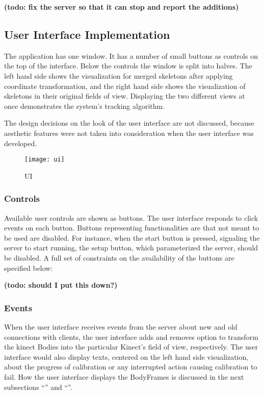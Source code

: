 \textbf{(todo: fix the server so that it can stop and report the additions)}

\subsection{User Interface Implementation}

The application has one window. It has a number of small buttons as controls on the top of the interface. Below the controls the window is split into halves. The left hand side shows the visualization for merged skeletons after applying coordinate transformation, and the right hand side shows the visualization of skeletons in their original fields of view. Displaying the two different views at once demonstrates the system's tracking algorithm.

The design decisions on the look of the user interface are not discussed, because aesthetic features were not taken into consideration when the user interface was developed.

\begin{figure}[!htb]
  \centering
  \texttt{[image: ui]}
  \caption{UI}
  \label{fig:ui}
\end{figure}

\subsubsection{Controls}

Available user controls are shown as buttons. The user interface responds to click events on each button. Buttons representing functionalities are that not meant to be used are disabled. For instance, when the start button is pressed, signaling the server to start running, the setup button, which parameterized the server, should be disabled. A full set of constraints on the availability of the buttons are specified below:

\textbf{(todo: should I put this down?)}

\subsubsection{Events}

When the user interface receives events from the server about new and old connections with clients, the user interface adds and removes option to transform the kinect Bodies into the particular Kinect's field of view, respectively. The user interface would also display texts, centered on the left hand side visualization, about the progress of calibration or any interrupted action causing calibration to fail. How the user interface displays the BodyFrames is discussed in the next subsections  ``'' and ``''.


